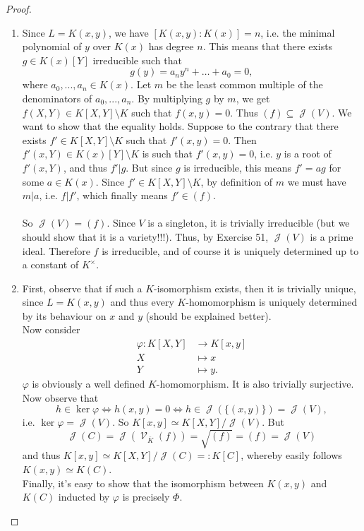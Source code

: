 \documentclass[12pt,a4paper]{report}
\theoremstyle{definition}
\theoremstyle{num.custom-title}
\DeclareMathOperator{\J}{\mathcal{J}}
\DeclareMathOperator{\V}{\mathcal{V}}
\DeclareMathOperator{\sm}{\setminus}
\DeclareMathOperator{\sse}{\subseteq}
\newcommand{\ol}{\overline}
\renewcommand{\phi}{\varphi}
\begin{document}
\begin{proof}\ 
\begin{enumerate}
\item Since $L=K(x,y)$, we have $[K(x,y):K(x)]=n$, i.e. the minimal polynomial of $y$ over $K(x)$ has degree $n$. This means that there exists $g \in K(x)[Y]$ irreducible such that
\[
g(y) = a_n y^n + \ldots + a_0 = 0,
\]
where $a_0,...,a_n \in K(x)$. Let $m$ be the least common multiple of the denominators of $a_0,...,a_n$. By multiplying $g$ by $m$, we get $f(X,Y) \in K[X,Y] \sm K$ such that $f(x,y)=0$. Thus $(f) \sse \J(V)$. We want to show that the equality holds. Suppose to the contrary that there exists $f' \in K[X,Y] \sm K$ such that $f'(x,y)=0$. Then $f'(x,Y) \in K(x)[Y] \sm K$ is such that $f'(x,y)=0$, i.e. $y$ is a root of $f'(x,Y)$, and thus $f'|g$. But since $g$ is irreducible, this means $f'= a g$ for some $a \in K(x)$. Since $f' \in K[X,Y] \sm K$, by definition of $m$ we must have $m | a$, i.e. $f|f'$, which finally means $f' \in (f)$.
\\
\\
So $\J(V)=(f)$. Since $V$ is a singleton, it is trivially irreducible (but we should show that it is a variety!!!). Thus, by Exercise 51, $\J(V)$ is a prime ideal. Therefore $f$ is irreducible, and of course it is uniquely determined up to a constant of $K^\times$.
\item First, observe that if such a $K$-isomorphism exists, then it is trivially unique, since $L=K(x,y)$ and thus every $K$-homomorphism is uniquely determined by its behaviour on $x$ and $y$ (should be explained better).\\
Now consider
\begin{align*}
\phi : K[X,Y] & \to K[x,y] \\
X & \mapsto x \\
Y & \mapsto y.
\end{align*}
$\phi$ is obviously a well defined $K$-homomorphism. It is also trivially surjective. Now observe that
\[
h \in \ker \phi \iff h(x,y)=0 \iff h \in \J(\{(x,y)\})=\J(V),
\]
i.e. $\ker \phi = \J(V)$. So $K[x,y] \simeq K[X,Y]/\J(V)$. But 
\[
\J(C)=\J(\V_{\ol{K}}(f))=\sqrt{(f)}=(f)=\J(V)
\]
and thus $K[x,y] \simeq K[X,Y]/\J(C) =: K[C]$, whereby easily follows $K(x,y) \simeq K(C)$.\\
Finally, it's easy to show that the isomorphism between $K(x,y)$ and $K(C)$ inducted by $\phi$ is precisely $\Phi$.
\end{enumerate}
\end{proof}
\end{document}
